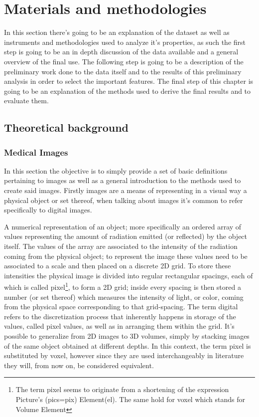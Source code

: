 \chapter{Materials and methodologies}\label{cap: Material_method}
In this section there's going to be an explanation of the dataset as well as instruments and methodologies used to analyze it's properties, as such the first step is going to be an in depth discussion of the data available and a general overview of the final use. The following step is going to be a description of the preliminary work done to the data itself and to the results of this preliminary analysis in order to select the important features. The final step of this chapter is going to be an explanation of the methods used to derive the final results and to evaluate them.

\section{Theoretical background}
\subsection{Medical Images}
In this section the objective is to simply provide a set of basic definitions pertaining to images as well as a general introduction to the methods used to create said images. Firstly images are a means of representing in a visual way a physical object or set thereof, when talking about images it's common to refer specifically to digital images.

\begin{definition}
A numerical representation of an object; more specifically an ordered array of values representing the amount of radiation emitted (or reflected) by the object itself. The values of the array are associated to the intensity of the radiation coming from the physical object; to represent the image these values need to be associated to a scale and then placed on a discrete 2D grid.
To store these intensities the physical image is divided into regular rectangular spacings, each of which is called pixel\footnote{The term pixel seems to originate from a shortening of the expression Picture's (pics=pix) Element(el). The same hold for voxel which stands for Volume Element}, to form a 2D grid; inside every spacing is then stored a number (or set thereof) which measures the intensity of light, or color, coming from the physical space corresponding to that grid-spacing.
The term digital refers to the discretization process that inherently happens in storage of the values, called pixel values, as well as in arranging them within the grid. It's possible to generalize from 2D images to 3D volumes, simply by stacking images of the same object obtained at different depths. In this context, the term pixel is substituted by voxel, however since they are used interchangeably in literature they will, from now on, be considered equivalent.
\end{definition}

